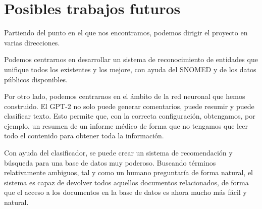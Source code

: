 \section{Posibles trabajos futuros}

Partiendo del punto en el que nos encontramos, podemos dirigir el proyecto en varias direcciones.

Podemos centrarnos en desarrollar un sistema de reconocimiento de entidades que unifique todos los existentes y los mejore, con ayuda del SNOMED y de los datos públicos disponibles.

Por otro lado, podemos centrarnos en el ámbito de la red neuronal que hemos construido. El GPT-2 no solo puede generar comentarios, puede resumir y puede clasificar texto. Esto permite que, con la correcta configuración, obtengamos, por ejemplo, un resumen de un informe médico de forma que no tengamos que leer todo el contenido para obtener toda la información.

Con ayuda del clasificador, se puede crear un sistema de recomendación y búsqueda para una base de datos muy poderoso. Buscando términos relativamente ambiguos, tal y como un humano preguntaría de forma natural, el sistema es capaz de devolver todos aquellos documentos relacionados, de forma que el acceso a los documentos en la base de datos es ahora mucho más fácil y natural.









